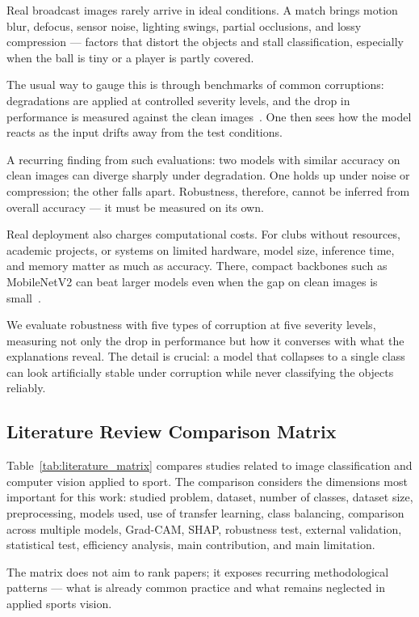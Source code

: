 \documentclass[preprint,12pt]{elsarticle}
\begin{document}
Real broadcast images rarely arrive in ideal conditions. A match brings motion blur, defocus, sensor noise, lighting swings, partial occlusions, and lossy compression --- factors that distort the objects and stall classification, especially when the ball is tiny or a player is partly covered.

The usual way to gauge this is through benchmarks of common corruptions: degradations are applied at controlled severity levels, and the drop in performance is measured against the clean images~\cite{hendrycks2019benchmarking}. One then sees how the model reacts as the input drifts away from the test conditions.

A recurring finding from such evaluations: two models with similar accuracy on clean images can diverge sharply under degradation. One holds up under noise or compression; the other falls apart. Robustness, therefore, cannot be inferred from overall accuracy --- it must be measured on its own.

Real deployment also charges computational costs. For clubs without resources, academic projects, or systems on limited hardware, model size, inference time, and memory matter as much as accuracy. There, compact backbones such as MobileNetV2 can beat larger models even when the gap on clean images is small~\cite{sandler2018mobilenetv2,martins2025mobilenet}.

We evaluate robustness with five types of corruption at five severity levels, measuring not only the drop in performance but how it converses with what the explanations reveal. The detail is crucial: a model that collapses to a single class can look artificially stable under corruption while never classifying the objects reliably.

\subsection{Literature Review Comparison Matrix}

Table~\ref{tab:literature_matrix} compares studies related to image classification and computer vision applied to sport. The comparison considers the dimensions most important for this work: studied problem, dataset, number of classes, dataset size, preprocessing, models used, use of transfer learning, class balancing, comparison across multiple models, Grad-CAM, SHAP, robustness test, external validation, statistical test, efficiency analysis, main contribution, and main limitation.

The matrix does not aim to rank papers; it exposes recurring methodological patterns --- what is already common practice and what remains neglected in applied sports vision.
\end{document}
